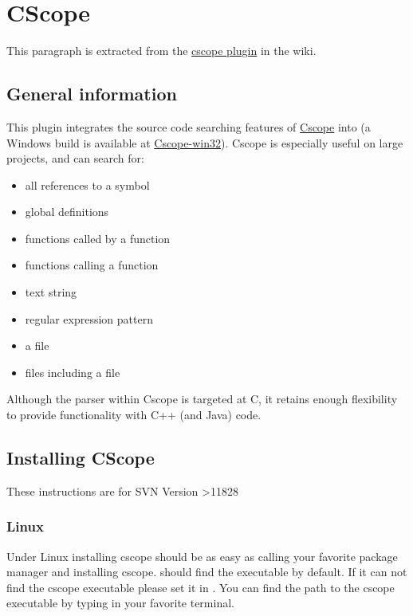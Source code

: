 \section{CScope}\label{sec:cscope}

This paragraph is extracted from the \href{https://wiki.codeblocks.org/index.php/Cscope_plugin}{cscope plugin} in the wiki.

\subsection{General information}

This plugin integrates the source code searching features of \href{https://cscope.sourceforge.net/}{Cscope} into \codeblocks (a Windows build is available at \href{https://code.google.com/p/cscope-win32/}{Cscope-win32}). Cscope is especially useful on large projects, and can search for:

\begin{itemize}[noitemsep]
\item all references to a symbol
\item global definitions
\item functions called by a function
\item functions calling a function
\item text string
\item regular expression pattern
\item a file
\item files including a file
\end{itemize}

Although the parser within Cscope is targeted at C, it retains enough flexibility to provide functionality with C++ (and Java) code.

\subsection{Installing CScope}

These instructions are for \codeblocks SVN Version \textgreater 11828

\subsubsection{Linux}

Under Linux installing cscope should be as easy as calling your favorite package manager and installing cscope. \codeblocks should find the executable by default. If it can not find the cscope executable please set it in . You can find the path to the cscope executable by typing  in your favorite terminal.

